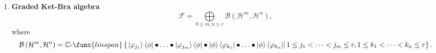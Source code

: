 \documentclass[aps,preprint]{revtex4}
\begin{document}
\begin{enumerate}
\begin{enumerate}
\begin{enumerate}
\item consider $j_{1}=k_{1},j_{2}\neq k_{2}$%
\begin{equation}
a_{j_{1}}^{\dagger }\wedge a_{j_{2}}^{\dagger }\wedge a_{j_{1}}\wedge
a_{k_{2}}=-a_{j_{1}}^{\dagger }\wedge a_{j_{1}}\wedge a_{j_{2}}^{\dagger
}\wedge a_{k_{2}}=-\left( a_{j_{1}}^{\dagger }a_{j_{1}}-\frac{1}{2}I_{%
\mathcal{F}}\right) a_{j_{2}}^{\dagger }a_{k_{2}}=-a_{j_{1}}^{\dagger
}a_{j_{1}}a_{j_{2}}^{\dagger }a_{k_{2}}+\frac{1}{2}a_{j_{2}}^{\dagger
}a_{k_{2}}
\end{equation}%
and $j_{1}=k_{1},j_{2}=k_{2}$ 
\begin{eqnarray}
a_{j_{1}}^{\dagger }\wedge a_{j_{2}}^{\dagger }\wedge a_{j_{1}}\wedge
a_{j_{2}} &=&-a_{j_{1}}^{\dagger }\wedge a_{j_{1}}\wedge a_{j_{2}}^{\dagger
}\wedge a_{j_{2}}=-\left( a_{j_{1}}^{\dagger }a_{j_{1}}-\frac{1}{2}I_{%
\mathcal{F}}\right) \left( a_{j_{2}}^{\dagger }a_{j_{2}}-\frac{1}{2}I_{%
\mathcal{F}}\right) \\
&=&-a_{j_{1}}^{\dagger }a_{j_{1}}a_{j_{2}}^{\dagger
}a_{j_{2}}+a_{j_{1}}^{\dagger }a_{j_{1}}+a_{j_{2}}^{\dagger }a_{j_{2}}-\frac{%
1}{4}I_{\mathcal{F}}
\end{eqnarray}%
showing that 
\begin{equation}
\mathcal{A}^{4}={\Huge \wedge }^{4}\mathcal{A}^{1}\subset \mathcal{A}%
_{1}\oplus \mathcal{A}_{2}\oplus \mathcal{A}_{4}.
\end{equation}

\item Recall%
\begin{equation}
\mathcal{F}=\bigoplus\limits_{0\leq n\leq 2r}\mathcal{A}^{n}={\Huge \wedge }%
\left( \mathcal{A}^{1}\right) =\mathcal{A}^{\left( 2r\right) },
\end{equation}%
where 
\begin{equation}
\mathcal{A}^{\left( n\right) }=\bigoplus\limits_{0\leq p\leq n}\mathcal{A}%
^{p}.
\end{equation}
\end{enumerate}

\item \textbf{Graded Ket-Bra algebra}%
\begin{equation}
\mathcal{F}=\bigoplus\limits_{0\leq m,n\leq r}\mathcal{B}\left( \mathcal{H}%
^{m},\mathcal{H}^{n}\right) ,
\end{equation}%
where 
\begin{equation}
\mathcal{B}\left( \mathcal{H}^{m},\mathcal{H}^{n}\right) =\mathbb{C}\text{-}%
\func{linspan}\left\{ \left. \left\vert \varphi _{j_{1}}\right\rangle
\left\langle \phi \right\vert \bullet \ldots \bullet \left\vert \varphi
_{j_{m}}\right\rangle \left\langle \phi \right\vert \bullet \left\vert \phi
\right\rangle \left\langle \varphi _{k_{1}}\right\vert \bullet \ldots
\bullet \left\vert \phi \right\rangle \left\langle \varphi
_{k_{n}}\right\vert \right\vert 1\leq j_{1}<\cdots <j_{m}\leq r,1\leq
k_{1}<\cdots <k_{n}\leq r\right\} .
\end{equation}
\end{enumerate}


\end{enumerate}
\end{document}
